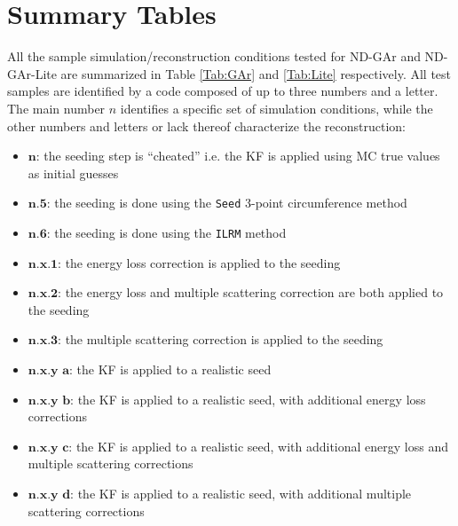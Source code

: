 \section{Summary Tables}
\label{App:Summary_Tables}
All the sample simulation/reconstruction conditions tested for ND-GAr and ND-GAr-Lite are summarized in Table \ref{Tab:GAr} and \ref{Tab:Lite} respectively. All test samples are identified by a code composed of up to three numbers and a letter. The main number $n$ identifies a specific set of simulation conditions, while the other numbers and letters or lack thereof characterize the reconstruction:
\begin{itemize}
    \item $\textbf{n:}$ the seeding step is \enquote{cheated} i.e. the KF is applied using MC true values as initial guesses
    \item $\textbf{n.5:}$ the seeding is done using the \texttt{Seed} 3-point circumference method
    \item $\textbf{n.6:}$ the seeding is done using the \texttt{ILRM} method
    \item $\textbf{n.x.1:}$ the energy loss correction is applied to the seeding
    \item $\textbf{n.x.2:}$ the energy loss and multiple scattering correction are both applied to the seeding
    \item $\textbf{n.x.3:}$ the multiple scattering correction is applied to the seeding
    \item $\textbf{n.x.y a:}$ the KF is applied to a realistic seed 
    \item $\textbf{n.x.y b:}$ the KF is applied to a realistic seed, with additional energy loss corrections
    \item $\textbf{n.x.y c:}$ the KF is applied to a realistic seed, with additional energy loss and multiple scattering corrections
    \item $\textbf{n.x.y d:}$ the KF is applied to a realistic seed, with additional multiple scattering corrections   
\end{itemize}
